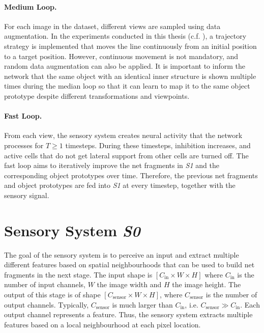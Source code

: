 \paragraph{Medium Loop.} For each image in the dataset, different views are sampled using data augmentation. In the experiments conducted in this thesis (c.f. ), a trajectory strategy is implemented that moves the line continuously from an initial position to a target position.
However, continuous movement is not mandatory, and random data augmentation can also be applied. It is important to inform the network that the same object with an identical inner structure is shown multiple times during the median loop so that it can learn to map it to the same object prototype despite different transformations and viewpoints.

\paragraph{Fast Loop.} From each view, the sensory system creates neural activity that the network processes for $T \geq 1$ timesteps. During these timesteps, inhibition increases, and active cells that do not get lateral support from other cells are turned off. 
The fast loop aims to iteratively improve the net fragments in \emph{S1} and the corresponding object prototypes over time. Therefore, the previous net fragments and object prototypes are fed into \emph{S1} at every timestep, together with the sensory signal.


\section{Sensory System \emph{S0}}
The goal of the sensory system is to perceive an input and extract multiple different features based on spatial neighbourhoods that can be used to build net fragments  in the next stage.
The input shape is $[C_{\text{in}} \times W \times H]$ where $C_{\text{in}}$ is the number of input channels, $W$ the image width and $H$ the image height.
The output of this stage is of shape $[C_{\text{sensor}} \times W \times H]$, where $C_{\text{sensor}}$ is the number of output channels. Typically, $C_{\text{sensor}}$ is much larger than $C_{\text{in}}$, i.e. $C_{\text{sensor}} \gg C_{\text{in}}$.
Each output channel represents a feature. Thus, the sensory system extracts multiple features based on a local neighbourhood at each pixel location.

